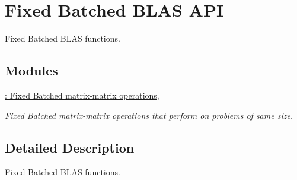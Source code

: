 \hypertarget{group__fixed__api}{}\section{Fixed Batched B\+L\+AS A\+PI}
\label{group__fixed__api}


Fixed Batched B\+L\+AS functions.  


\subsection*{Modules}
\begin{DoxyCompactItemize}
\item 
\hyperlink{group__core__batched__blas}{\+: Fixed Batched matrix-\/matrix operations,}
\begin{DoxyCompactList}\small\item\em Fixed Batched matrix-\/matrix operations that perform on problems of same size. \end{DoxyCompactList}\end{DoxyCompactItemize}


\subsection{Detailed Description}
Fixed Batched B\+L\+AS functions. 



